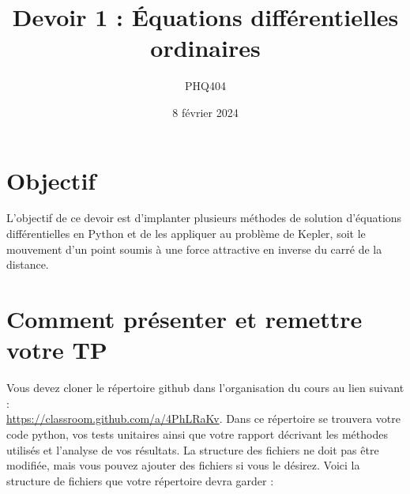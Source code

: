 \documentclass[12pt, letterpaper]{article}
\begin{document}
\title{Devoir 1 : Équations différentielles ordinaires}
\author{PHQ404}
\date{8 février 2024}
\maketitle

\section{Objectif}\label{sec:objectif}

\noindent L'objectif de ce devoir est d'implanter plusieurs méthodes de solution
d'équations différentielles en Python 
et de les appliquer au problème de Kepler,
soit le mouvement d'un point soumis à une force attractive 
en inverse du carré de la distance.


\section{Comment présenter et remettre votre TP}\label{sec:comment-presenter-et-remettre-votre-tp}

\noindent Vous devez cloner le répertoire github dans l'organisation du cours au lien suivant :\\
\href{https://classroom.github.com/a/4PhLRaKv}{https://classroom.github.com/a/4PhLRaKv}.
Dans ce répertoire se trouvera votre code python, vos tests unitaires ainsi que votre rapport
décrivant les méthodes utilisés et l'analyse de vos résultats.
La structure des fichiers ne doit pas être modifiée, mais vous pouvez ajouter des fichiers si vous le désirez.
Voici la structure de fichiers que votre répertoire devra garder :

\bigskip
\end{document}
